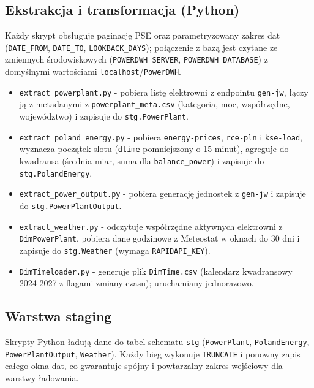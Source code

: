 \documentclass[12pt]{article}
\begin{document}
	\subsection{Ekstrakcja i transformacja (Python)}
	Każdy skrypt obsługuje paginację PSE oraz parametryzowany zakres dat (\texttt{DATE\_FROM}, \texttt{DATE\_TO}, \texttt{LOOKBACK\_DAYS}); połączenie z bazą jest czytane ze zmiennych środowiskowych (\texttt{POWERDWH\_SERVER}, \texttt{POWERDWH\_DATABASE}) z domyślnymi wartościami \texttt{localhost}/\texttt{PowerDWH}.
	\begin{itemize}
		\item \texttt{extract\_powerplant.py} - pobiera listę elektrowni z endpointu \texttt{gen-jw}, łączy ją z metadanymi z \texttt{powerplant\_meta.csv} (kategoria, moc, współrzędne, województwo) i zapisuje do \texttt{stg.PowerPlant}.
		\item \texttt{extract\_poland\_energy.py} - pobiera \texttt{energy-prices}, \texttt{rce-pln} i \texttt{kse-load}, wyznacza początek slotu (\texttt{dtime} pomniejszony o 15 minut), agreguje do kwadransa (średnia miar, suma dla \texttt{balance\_power}) i zapisuje do \texttt{stg.PolandEnergy}.
		\item \texttt{extract\_power\_output.py} - pobiera generację jednostek z \texttt{gen-jw} i zapisuje do \texttt{stg.PowerPlantOutput}.
		\item \texttt{extract\_weather.py} - odczytuje współrzędne aktywnych elektrowni z \texttt{DimPowerPlant}, pobiera dane godzinowe z Meteostat w oknach do 30 dni i zapisuje do \texttt{stg.Weather} (wymaga \texttt{RAPIDAPI\_KEY}).
		\item \texttt{DimTimeloader.py} - generuje plik \texttt{DimTime.csv} (kalendarz kwadransowy 2024-2027 z flagami zmiany czasu); uruchamiany jednorazowo.
	\end{itemize}

	\subsection{Warstwa staging}
	Skrypty Python ładują dane do tabel schematu \texttt{stg} (\texttt{PowerPlant}, \texttt{PolandEnergy}, \texttt{PowerPlantOutput}, \texttt{Weather}). Każdy bieg wykonuje \texttt{TRUNCATE} i ponowny zapis całego okna dat, co gwarantuje spójny i powtarzalny zakres wejściowy dla warstwy ładowania.
\end{document}
